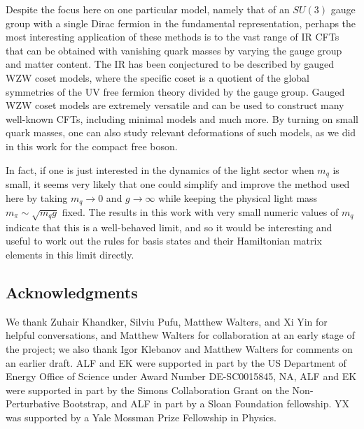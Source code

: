 \documentclass[12pt]{article}
\newcommand{\red}{\bf\color{red}}
\begin{document}
Despite the focus here on one particular model, namely that of an $SU(3)$ gauge group with a single Dirac fermion in the fundamental representation, perhaps the most interesting application of these methods is to the vast range of IR CFTs that can be obtained with vanishing quark masses by varying the gauge group and matter content. The IR has been conjectured  \cite{Delmastro:2021otj,Kutasov:1993gq, Kutasov:1994xq,Bhanot:1993xp} to be described by gauged WZW coset models, where the specific coset is a quotient of the global symmetries of the UV free fermion theory divided by the gauge group.  Gauged WZW coset models are extremely versatile and can be used to construct many well-known CFTs, including minimal models and much more. By turning on small quark masses, one can also study relevant deformations of such models, as we did in this work for the compact free boson.  %

In fact, if one is just interested in the dynamics of the light sector when $m_q$ is small, it seems very likely that one could simplify and improve the method used here by taking $m_q \rightarrow 0$ and $g \rightarrow \infty$ while keeping the physical light mass $m_\pi \sim \sqrt{m_q g}$ fixed. The results in this work with very small numeric values of $m_q$ indicate that this is a well-behaved limit, and so it would be interesting and useful to work out the rules for basis states and their Hamiltonian matrix elements in this limit directly.


\begin{center}
\subsection*{Acknowledgments}
\end{center}


We thank  Zuhair Khandker, Silviu Pufu, Matthew Walters, and Xi Yin for helpful conversations, and Matthew Walters for collaboration at an early stage of the project; we also thank Igor Klebanov and Matthew Walters for comments on an earlier draft. ALF and EK were supported in part by the US Department of Energy Office of Science under Award Number DE-SC0015845, NA, ALF and EK were supported in part by  the Simons Collaboration Grant on the Non-Perturbative Bootstrap, and ALF in part by a Sloan Foundation fellowship. YX was supported by a  Yale Mossman  Prize Fellowship in Physics.

\


\appendix
\end{document}
